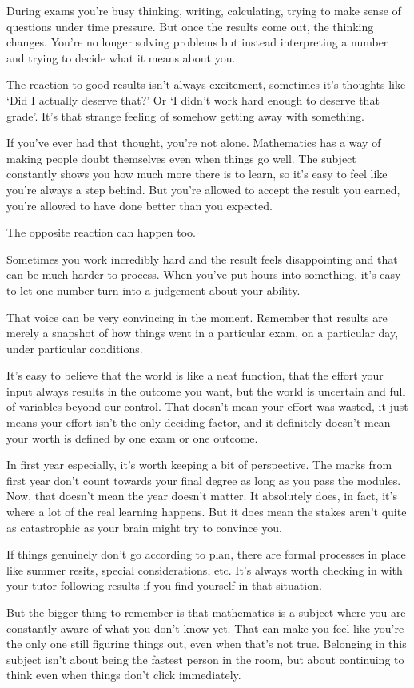 
During exams you’re busy thinking, writing, calculating, trying to make sense of questions under time pressure. But once the results come out, the thinking changes. You’re no longer solving problems but instead interpreting a number and trying to decide what it means about you.

The reaction to good results isn’t always excitement, sometimes it’s thoughts like  `Did I actually deserve that?' Or `I didn’t work hard enough to deserve that grade'. It’s that strange feeling of somehow getting away with something.

If you’ve ever had that thought, you’re not alone. Mathematics has a way of making people doubt themselves even when things go well. The subject constantly shows you how much more there is to learn, so it’s easy to feel like you’re always a step behind. But you’re allowed to accept the result you earned, you’re allowed to have done better than you expected.

The opposite reaction can happen too.

Sometimes you work incredibly hard and the result feels disappointing and that can be much harder to process. When you’ve put hours into something, it’s easy to let one number turn into a judgement about your ability.

That voice can be very convincing in the moment. Remember that results are merely a snapshot of how things went in a particular exam, on a particular day, under particular conditions. 

It’s easy to believe that the world is like a neat function, that the effort your input always results in the outcome you want, but the world is uncertain and full of variables beyond our control. That doesn’t mean your effort was wasted, it just means your effort isn’t the only deciding factor, and it definitely doesn’t mean your worth is defined by one exam or one outcome. 

In first year especially, it’s worth keeping a bit of perspective. The marks from first year don’t count towards your final degree as long as you pass the modules. Now, that doesn’t mean the year doesn’t matter. It absolutely does, in fact, it’s where a lot of the real learning happens. But it does mean the stakes aren’t quite as catastrophic as your brain might try to convince you.

If things genuinely don’t go according to plan, there are formal processes in place like summer resits, special considerations, etc. It’s always worth checking in with your tutor following results if you find yourself in that situation. 

But the bigger thing to remember is that mathematics is a subject where you are constantly aware of what you don’t know yet. That can make you feel like you’re the only one still figuring things out, even when that's not true. Belonging in this subject isn’t about being the fastest person in the room, but about continuing to think even when things don’t click immediately.

